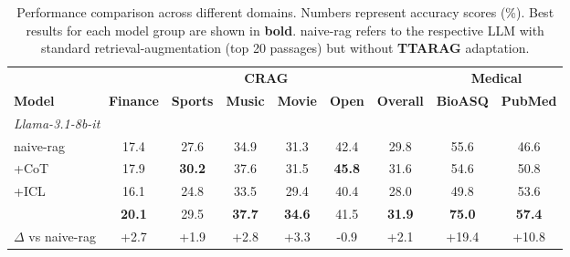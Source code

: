 \documentclass{article}
\newcommand{\ourmethod}{{\fontfamily{lmtt}\selectfont \textbf{TTARAG}}\xspace}
\begin{document}
\begin{table}[t]
  \footnotesize
    \centering
    \caption{Performance comparison across different domains. Numbers represent accuracy scores (\%). Best results for each model group are shown in \textbf{bold}. naive-rag refers to the respective LLM with standard retrieval-augmentation (top 20 passages) but without \ourmethod adaptation.}
    \label{tab:results}
    \begin{tabular}{@{}lcccccccc@{}}
    \toprule
    & \multicolumn{6}{c}{\textbf{CRAG}} & \multicolumn{2}{c}{\textbf{Medical}} \\
    \cmidrule(lr){2-7} \cmidrule(l){8-9}
    \textbf{Model} & \textbf{Finance} & \textbf{Sports} & \textbf{Music} & \textbf{Movie} & \textbf{Open} & \textbf{Overall} & \textbf{BioASQ} & \textbf{PubMed} \\
    \midrule
    \multicolumn{9}{l}{\textit{Llama-3.1-8b-it}} \\
    \cmidrule(l){1-9}
    naive-rag & 17.4 & 27.6 & 34.9 & 31.3 & 42.4 & 29.8 & 55.6 & 46.6 \\
    +CoT & 17.9 & \textbf{30.2} &37.6 & 31.5 & \textbf{45.8} & 31.6 & 54.6 & 50.8 \\
    +ICL & 16.1 & 24.8 & 33.5 & 29.4 & 40.4 & 28.0 & 49.8 & 53.6 \\
    \rowcolor{gray!20}\ourmethod & \textbf{20.1} & 29.5 & \textbf{37.7} & \textbf{34.6} & 41.5 & \textbf{31.9} & \textbf{75.0} &  \textbf{57.4}  \\
    \rowcolor{gray!20}$\Delta$ vs naive-rag & +2.7 & +1.9 & +2.8 & +3.3 & -0.9 & +2.1 & +19.4 & +10.8 \\
    \midrule
    

\end{tabular}
\end{table}
\end{document}
